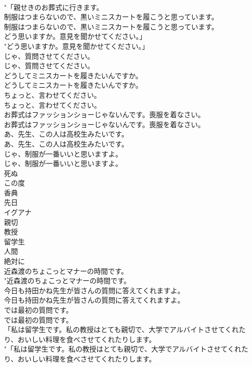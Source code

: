 \documentclass[8pt]{extreport}
\begin{document}
\begin{CJK}{UTF8}{min}
\\	"「親せきのお葬式に行きます。 
\\	制服はつまらないので、黒いミニスカートを履こうと思っています。	
\\	制服はつまらないので、黒いミニスカートを履こうと思っています。 
\\	どう思いますか。意見を聞かせてください。」	
\\	"どう思いますか。意見を聞かせてください。」 
\\	じゃ、質問させてください。	
\\	じゃ、質問させてください。 
\\	どうしてミニスカートを履きたいんですか。	
\\	どうしてミニスカートを履きたいんですか。 
\\	ちょっと、言わせてください。	
\\	ちょっと、言わせてください。 
\\	お葬式はファッションショーじゃないんです。喪服を着なさい。	
\\	お葬式はファッションショーじゃないんです。喪服を着なさい。 
\\	あ、先生、この人は高校生みたいです。	
\\	あ、先生、この人は高校生みたいです。 
\\	じゃ、制服が一番いいと思いますよ。	
\\	じゃ、制服が一番いいと思いますよ。 
\\	死ぬ
\\	この度
\\	香典
\\	先日
\\	イグアナ
\\	親切
\\	教授
\\	留学生
\\	人間
\\	絶対に
\\	近森渡のちょこっとマナーの時間です。	
\\	"近森渡のちょこっとマナーの時間です。 
\\	今日も持田かね先生が皆さんの質問に答えてくれますよ。	
\\	今日も持田かね先生が皆さんの質問に答えてくれますよ。 
\\	では最初の質問です。	
\\	では最初の質問です。 
\\	「私は留学生です。私の教授はとても親切で、大学でアルバイトさせてくれたり、おいしい料理を食べさせてくれたりします。	
\\	"「私は留学生です。私の教授はとても親切で、大学でアルバイトさせてくれたり、おいしい料理を食べさせてくれたりします。 

\end{CJK}
\end{document}
